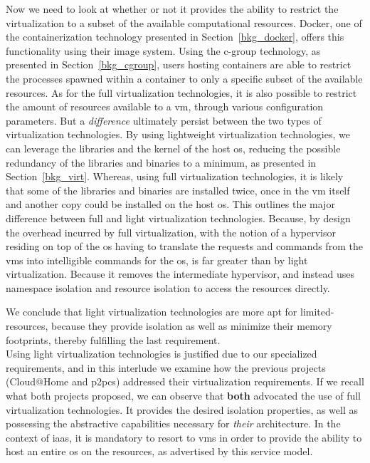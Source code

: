 \documentclass[12pt, titlepage]{uo_temp}
\begin{document}
     Now we need to look at whether or not it provides the ability to restrict the
     virtualization to a subset of the available computational resources. Docker, one of
     the containerization technology presented in Section~\ref{bkg_docker}, offers this
     functionality using their image system. Using the c-group technology, as presented in
     Section~\ref{bkg_cgroup}, users hosting containers are able to restrict the processes
     spawned within a container to only a specific subset of the available resources. As
     for the full virtualization technologies, it is also possible to restrict the amount
     of resources available to a \gls{vm}, through various configuration parameters. But a
     \emph{difference} ultimately persist between the two types of virtualization
     technologies. By using lightweight virtualization technologies, we can leverage the
     libraries and the kernel of the host \gls{os}, reducing the possible redundancy of
     the libraries and binaries to a minimum, as presented in
     Section~\ref{bkg_virt}. Whereas, using full virtualization technologies, it is likely
     that some of the libraries and binaries are installed twice, once in the \gls{vm}
     itself and another copy could be installed on the host \gls{os}. This outlines the
     major difference between full and light virtualization technologies. Because, by
     design the overhead incurred by full virtualization, with the notion of a hypervisor
     residing on top of the \gls{os} having to translate the requests and commands from
     the \gls{vm}s into intelligible commands for the \gls{os}, is far greater than by
     light virtualization. Because it removes the intermediate hypervisor, and instead
     uses namespace isolation and resource isolation to access the resources directly.

     We conclude that light virtualization technologies are more apt for
     limited-resources, because they provide isolation as well as minimize their memory
     footprints, thereby fulfilling the last requirement.\\

     Using light virtualization technologies is justified due to our specialized
     requirements, and in this interlude we examine how the previous projects (Cloud@Home
     and \gls{p2pcs}) addressed their virtualization requirements.
     If we recall what both projects proposed, we can observe that \textbf{both} advocated
     the use of full virtualization technologies. It provides the desired isolation
     properties, as well as possessing the abstractive capabilities necessary for
     \emph{their} architecture. In the context of \gls{iaas}, it is mandatory to
     resort to \gls{vm}s in order to provide the ability to host an entire
     \gls{os} on the resources, as advertised by this service model.
\end{document}
